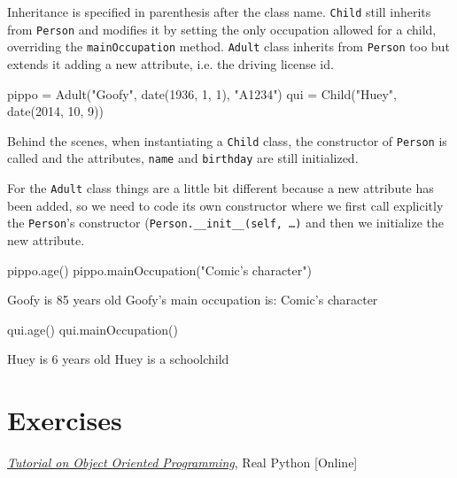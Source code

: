 Inheritance is specified in parenthesis after the class name. \texttt{Child} still inherits from \texttt{Person} and modifies it by setting the only occupation allowed for a child, overriding the \texttt{mainOccupation} method. \texttt{Adult} class inherits from \texttt{Person} too but extends it adding a new attribute, i.e. the driving license id. 

\begin{ipython}
pippo = Adult("Goofy", date(1936, 1, 1), "A1234")
qui = Child("Huey", date(2014, 10, 9))
\end{ipython}

Behind the scenes, when instantiating a \texttt{Child} class, the constructor of \texttt{Person} is called and the attributes, \texttt{name} and \texttt{birthday} are still initialized.  

For the \texttt{Adult} class things are a little bit different because a new attribute has been added, so we need to code its own constructor where we first call explicitly the \texttt{Person}'s constructor (\texttt{Person.\_\_init\_\_(self, \ldots)} and then we initialize the new attribute.

\begin{ipython}
pippo.age()
pippo.mainOccupation("Comic's character")
\end{ipython}
\begin{ioutput}
Goofy is 85 years old
Goofy's main occupation is: Comic's character
\end{ioutput}

\begin{ipython}
qui.age()
qui.mainOccupation()
\end{ipython}
\begin{ioutput}
Huey is 6 years old
Huey is a schoolchild
\end{ioutput}

\section*{Exercises}


\begin{thebibliography}{9}
 \href{https://realpython.com/python3-object-oriented-programming/}{\emph{Tutorial on Object Oriented Programming}}, Real Python [Online]
\end{thebibliography}
